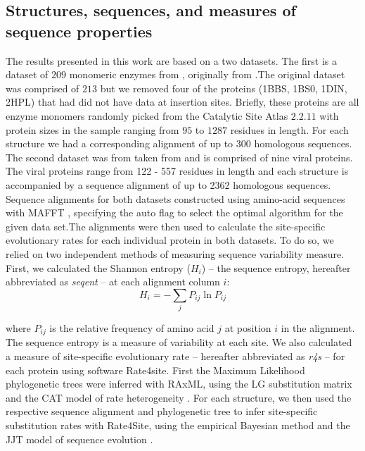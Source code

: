 \documentclass[12pt]{article}
\begin{document}
    \subsection*{Structures, sequences, and measures of sequence properties } 
    The results presented in this work are based on a two datasets. The first is a dataset of $209$ monomeric enzymes from \cite{Huangetal2014}, originally from \cite{Yehetal2014}.The original dataset was comprised of $213$ but we removed four of the proteins (1BBS, 1BS0, 1DIN, 2HPL) that had did not have data at insertion sites. Briefly, these proteins are all enzyme monomers   randomly picked from the Catalytic Site Atlas $2.2.11$ \citep{Porteretal2004} with protein sizes in the sample ranging from $95$ to $1287$ residues in length. For each structure we had a corresponding alignment of up to 300 homologous sequences.  The second dataset was from taken from \cite{Shahmoradietal2014} and is comprised of nine viral proteins. The viral proteins range from 122 - 557 residues in length and each structure is accompanied by a sequence alignment of up to 2362 homologous sequences. Sequence alignments for both datasets constructed using amino-acid sequences with MAFFT \citep{Katohetal2002, Katohetal2005}, specifying the auto flag to select the optimal algorithm for the given data set.The alignments were then used to calculate the site-specific evolutionary rates for each individual protein in both datasets. To do so, we relied on two independent methods of measuring sequence variability measure. First, we calculated the Shannon entropy ($H_i$) -- the sequence entropy, hereafter abbreviated as {\it seqent} -- at each alignment column $i$:
    \begin{equation}
        \label{eqn:shannon}
        H_i = -\sum_j P_{ij}\ln P_{ij}
    \end{equation}

    where $P_{ij}$ is the relative frequency of amino acid $j$ at position $i$ in the alignment. The sequence entropy is a measure of variability at each site. We also calculated a measure of site-specific evolutionary rate -- hereafter abbreviated as {\it r4s} -- for each protein using software Rate4site. First the Maximum Likelihood phylogenetic trees were inferred with RAxML, using the LG substitution matrix and the CAT model of rate heterogeneity \citep{Stamatakis2006, Stamatakis2014}. For each structure, we then used the respective sequence alignment and phylogenetic tree to infer site-specific substitution rates with Rate4Site, using the empirical Bayesian method and the JJT model of sequence evolution \citep{Mayroseetal2004}.
\end{document}
